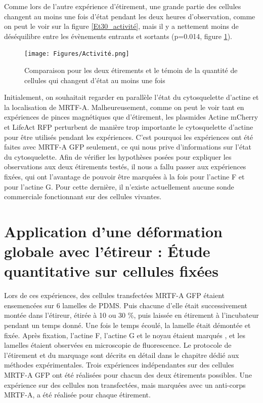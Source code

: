 \documentclass{report}
\begin{document}
Comme lors de l'autre expérience d'étirement, une grande partie des cellules changent au moins une fois d'état pendant les deux heures d'observation, comme on peut le voir sur la figure \ref{Et30_activité}, mais il y a nettement moins de déséquilibre entre les évènements entrants et sortants (p=0.014, figure \ref{Et30_ES}). 

 \begin{figure}
 \texttt{[image: Figures/Activité.png]} 
 \caption{\label{Et30_ES} Comparaison pour les deux étirements et le témoin de la quantité de cellules qui changent d'état au moins une fois}
 \end{figure}
 
Initialement, on souhaitait regarder en parallèle l'état du cytosquelette d'actine et la localisation de MRTF-A. 
Malheureusement, comme on peut le voir tant en expériences de pinces magnétiques que d'étirement, les plasmides Actine mCherry et LifeAct RFP perturbent de manière trop importante le cytosquelette d'actine pour être utilisés pendant les expériences. 
C'est pourquoi les expériences ont été faites avec MRTF-A GFP seulement, ce qui nous prive d'informations sur l'état du cytosquelette.
Afin de vérifier les hypothèses posées pour expliquer les observations aux deux étirements testés, il nous a fallu passer aux expériences fixées, qui ont l'avantage de pouvoir être marquées à la fois pour l'actine F et pour l'actine G. Pour cette dernière, il n'existe actuellement aucune sonde commerciale fonctionnant sur des cellules vivantes. 

\section{Application d'une déformation globale avec l'étireur : \'Etude quantitative sur cellules fixées}

Lors de ces expériences, des cellules transfectées MRTF-A GFP étaient ensemencées sur 6 lamelles de PDMS. Puis chacune d'elle était successivement montée dans l'étireur, étirée à 10 ou 30 \%, puis laissée en étirement à l'incubateur pendant un temps donné. Une fois le temps écoulé, la lamelle était démontée et fixée. Après fixation, l'actine F, l'actine G et le noyau étaient marqués , et les lamelles étaient observées en microscopie de fluorescence. Le protocole de l'étirement et du marquage sont décrits en détail dans le chapitre dédié aux méthodes expérimentales. 
Trois expériences indépendantes sur des cellules MRTF-A GFP ont été réalisées pour chacun des deux étirements possibles. Une expérience sur des cellules non transfectées, mais marquées avec un anti-corps MRTF-A, a été réalisée pour chaque étirement. 
\end{document}
